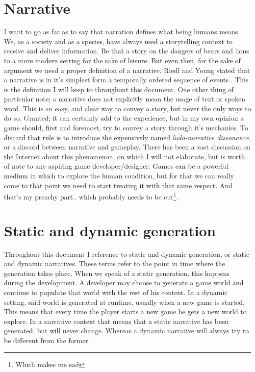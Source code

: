 \section{Narrative}
I want to go as far as to say that narration defines what being humans means.
We, as a society and as a species, have always used a storytelling context to receive and deliver information.
Be that a story on the dangers of bears and lions to a more modern setting for the sake of leisure.
But even then, for the sake of argument we need a proper definition of a narrative.
Riedl and Young stated that a narrative is in it's simplest form a temporally ordered sequence of events \citep{Riedl:2004:IPM:1018409.1018753}.
This is the definition I will keep to throughout this document.
One other thing of particular note; a narrative does not explicitly mean the usage of text or spoken word.
This is an easy, and clear way to convey a story, but never the only ways to do so.
Granted; it can certainly add to the experience, but in my own opinion a game should, first and foremost, try to convey a story through it's mechanics.
To discard that rule is to introduce the expensively named \textit{ludo-narrative dissonance}, or a discord between narrative and gameplay.
There has been a vast discussion on the Internet about this phenomenon, on which I will not elaborate, but is worth of note to any aspiring game developer/designer.
Games can be a powerful medium in which to explore the human condition, but for that we can really come to that point we need to start treating it with that same respect.
And that's my preachy part..
which probably needs to be cut\footnote{Which makes me sad}.
\section{Static and dynamic generation}
\label{sec:static_dynamic_generation}
Throughout this document I reference to static and dynamic generation, or static and dynamic narratives.
These terms refer to the point in time where the generation takes place.
When we speak of a static generation, this happens during the development.
A developer may choose to generate a game world and continue to populate that world with the rest of his content.
In a dynamic setting, said world is generated at runtime, usually when a new game is started.
This means that every time the player starts a new game he gets a new world to explore.
In a narrative context that means that a static narrative has been generated, but will never change.
Whereas a dynamic narrative will always try to be different from the former.
